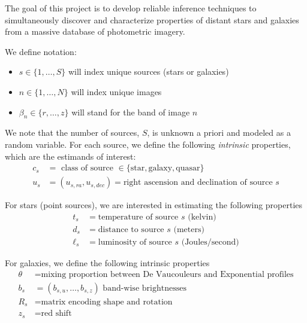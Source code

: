 \documentclass[11pt]{article}
\begin{document}
The goal of this project is to develop reliable inference techniques to simultaneously discover and characterize properties of distant stars and galaxies from a massive database of photometric imagery.  

We define notation: 
\begin{itemize} \itemsep 0pt
\item $s \in \{1, \dots, S\}$ will index unique sources (stars or galaxies)
\item $n \in \{1, \dots, N\}$ will index unique images
\item $\beta_n \in \{r, \dots, z\}$ will stand for the band of image $n$
\end{itemize}

We note that the number of sources, $S$, is unknown a priori and modeled as a random variable.  For each source, we define the following \emph{intrinsic} properties, which are the estimands of interest: 
\begin{align*}
  c_s &= \text{ class of source } \in \{ \text{star}, \text{galaxy}, \text{quasar} \} \\
  u_s &= (u_{s,ra}, u_{s,dec}) = \text{right ascension and declination of source $s$} 
\end{align*}

For stars (point sources), we are interested in estimating the following properties 
\begin{align*}
  t_s &= \text{temperature of source $s$ (kelvin)} \\
  d_s &= \text{distance to source $s$ (meters)} \\
  \ell_s &= \text{luminosity of source $s$ (Joules/second)} 
\end{align*}

For galaxies, we define the following intrinsic properties 
\begin{align*}
  \theta &= \text{mixing proportion between De Vaucouleurs and Exponential profiles} \\
  b_s    &= (b_{s,u}, \dots, b_{s,z}) \text{ band-wise brightnesses } \\
  R_s    &= \text{matrix encoding shape and rotation} \\
  z_s    &= \text{red shift}
\end{align*}

\end{document}
